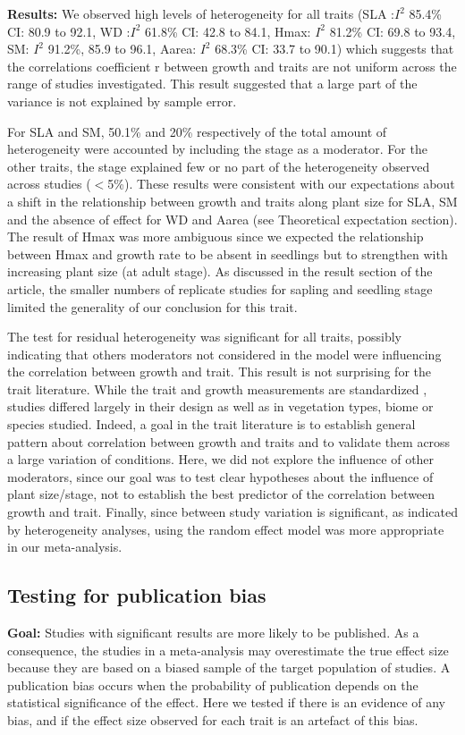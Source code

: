 \documentclass[a4paper]{article}\usepackage[]{graphicx}\usepackage[]{color}
\begin{document}
\begin{appendices}
\textbf{Results:} We observed high levels of heterogeneity for all traits (SLA :$I^{2}$ 85.4\% CI: 80.9 to 92.1, WD :$I^{2}$ 61.8\% CI: 42.8 to 84.1, Hmax: $I^{2}$ 81.2\% CI: 69.8 to 93.4, SM: $I^{2}$ 91.2\%, 85.9 to 96.1, Aarea: $I^{2}$ 68.3\% CI: 33.7 to 90.1) which suggests that the correlations coefficient r between growth and traits are not uniform across the range of studies investigated. This result suggested that a large part of the variance is not explained by sample error.

For SLA and SM, 50.1\% and 20\% respectively of the total amount of heterogeneity were accounted by including the stage as a moderator. For the other traits, the stage explained few or no part of the heterogeneity observed across studies ($<$5\%). These results were consistent with our expectations about a shift in the relationship between growth and traits along plant size for SLA, SM and the absence of effect for WD and Aarea (see Theoretical expectation section). The result of Hmax was more ambiguous since we expected the relationship between Hmax and growth rate to be absent in seedlings but to strengthen with increasing plant size (at adult stage). As discussed in the result section of the article, the smaller numbers of replicate studies for sapling and seedling stage limited the generality of our conclusion for this trait.

The test for residual heterogeneity was significant for all traits, possibly indicating that others moderators not considered in the model were influencing the correlation between growth and trait. This result is not surprising for the trait literature. While the trait and growth measurements are standardized \citep{Cornelissen:2003gw}, studies differed largely in their design as well as in vegetation types, biome or species studied. Indeed, a goal in the trait literature is to establish general pattern about correlation between growth and traits and to validate them across a large variation of conditions. Here, we did not explore the influence of other moderators, since our goal was to test clear hypotheses about the influence of plant size/stage, not to establish the best predictor of the correlation between growth and trait. Finally, since between study variation is significant, as indicated by heterogeneity analyses, using the random effect model was more appropriate in our meta-analysis.

\subsection{Testing for publication bias}
\textbf{Goal:} Studies with significant results are more likely to be published. As a consequence, the studies in a meta-analysis may overestimate the true effect size because they are based on a biased sample of the target population of studies. A publication bias occurs when the probability of publication depends on the statistical significance of the effect. Here we tested if there is an evidence of any bias, and if the effect size observed for each trait is an artefact of this bias.


\end{appendices}
\end{document}
